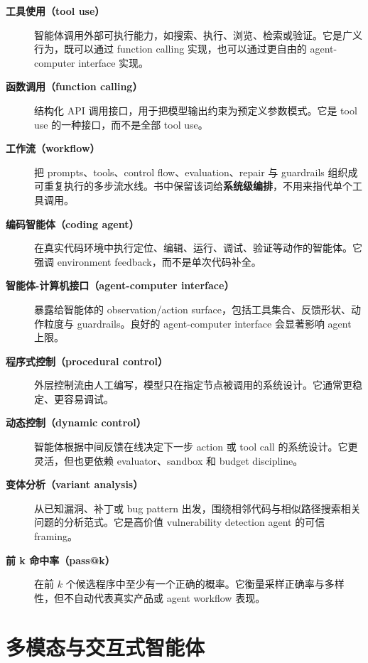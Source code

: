 \begin{description}
\item[\textbf{工具使用（tool use）}] 智能体调用外部可执行能力，如搜索、执行、浏览、检索或验证。它是广义行为，既可以通过 function calling 实现，也可以通过更自由的 agent-computer interface 实现。

\item[\textbf{函数调用（function calling）}] 结构化 API 调用接口，用于把模型输出约束为预定义参数模式。它是 tool use 的一种接口，而不是全部 tool use。

\item[\textbf{工作流（workflow）}] 把 prompts、tools、control flow、evaluation、repair 与 guardrails 组织成可重复执行的多步流水线。书中保留该词给\textbf{系统级编排}，不用来指代单个工具调用。

\item[\textbf{编码智能体（coding agent）}] 在真实代码环境中执行定位、编辑、运行、调试、验证等动作的智能体。它强调 environment feedback，而不是单次代码补全。

\item[\textbf{智能体-计算机接口（agent-computer interface）}] 暴露给智能体的 observation/action surface，包括工具集合、反馈形状、动作粒度与 guardrails。良好的 agent-computer interface 会显著影响 agent 上限。

\item[\textbf{程序式控制（procedural control）}] 外层控制流由人工编写，模型只在指定节点被调用的系统设计。它通常更稳定、更容易调试。

\item[\textbf{动态控制（dynamic control）}] 智能体根据中间反馈在线决定下一步 action 或 tool call 的系统设计。它更灵活，但也更依赖 evaluator、sandbox 和 budget discipline。

\item[\textbf{变体分析（variant analysis）}] 从已知漏洞、补丁或 bug pattern 出发，围绕相邻代码与相似路径搜索相关问题的分析范式。它是高价值 vulnerability detection agent 的可信 framing。

\item[\textbf{前 k 命中率（pass@k）}] 在前 $k$ 个候选程序中至少有一个正确的概率。它衡量采样正确率与多样性，但不自动代表真实产品或 agent workflow 表现。
\end{description}

\section{多模态与交互式智能体}

